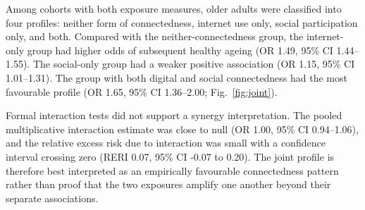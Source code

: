 \documentclass[pdflatex,sn-nature]{sn-jnl}
\begin{document}
Among cohorts with both exposure measures, older adults were classified into four profiles: neither form of connectedness, internet use only, social participation only, and both. Compared with the neither-connectedness group, the internet-only group had higher odds of subsequent healthy ageing (OR 1.49, 95\% CI 1.44--1.55). The social-only group had a weaker positive association (OR 1.15, 95\% CI 1.01--1.31). The group with both digital and social connectedness had the most favourable profile (OR 1.65, 95\% CI 1.36--2.00; Fig.~\ref{fig:joint}).

Formal interaction tests did not support a synergy interpretation. The pooled multiplicative interaction estimate was close to null (OR 1.00, 95\% CI 0.94--1.06), and the relative excess risk due to interaction was small with a confidence interval crossing zero (RERI 0.07, 95\% CI -0.07 to 0.20). The joint profile is therefore best interpreted as an empirically favourable connectedness pattern rather than proof that the two exposures amplify one another beyond their separate associations.
\end{document}
